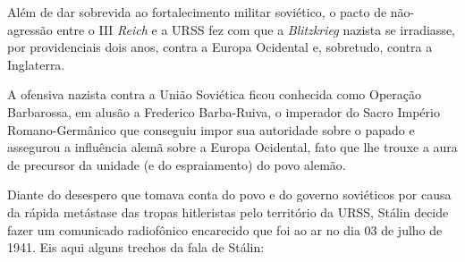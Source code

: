 Além de dar sobrevida ao fortalecimento militar soviético, o pacto de
não-agressão entre o III \emph{Reich} e a URSS fez com que a
\emph{Blitzkrieg} nazista se irradiasse, por providenciais dois anos,
contra a Europa Ocidental e, sobretudo, contra a Inglaterra.

A ofensiva nazista contra a União Soviética ficou conhecida como
Operação Barbarossa, em alusão a Frederico Barba-Ruiva, o imperador do
Sacro Império Romano-Germânico que conseguiu impor sua autoridade sobre
o papado e assegurou a influência alemã sobre a Europa Ocidental, fato
que lhe trouxe a aura de precursor da unidade (e do espraiamento) do
povo alemão.

Diante do desespero que tomava conta do povo e do governo soviéticos por
causa da rápida metástase das tropas hitleristas pelo território da
URSS, Stálin decide fazer um comunicado radiofônico encarecido que foi
ao ar no dia 03 de julho de 1941. Eis aqui alguns trechos da fala de
Stálin:

